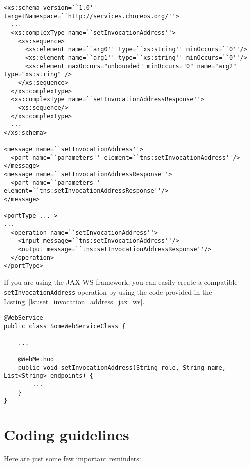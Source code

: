 \documentclass[a4paper, 10pt]{article}
\begin{document}
{\footnotesize
\begin{lstlisting}[caption=Parts of the service WSDL that define the \texttt{setInvocationAddress} operation, label=lst:set_invocation_address_wsdl] 
<xs:schema version=``1.0'' targetNamespace=``http://services.choreos.org/''>
  ...
  <xs:complexType name=``setInvocationAddress''>
    <xs:sequence>
      <xs:element name=``arg0'' type=``xs:string'' minOccurs=``0''/>
      <xs:element name=``arg1'' type=``xs:string'' minOccurs=``0''/>
      <xs:element maxOccurs="unbounded" minOccurs="0" name="arg2" type="xs:string" />
    </xs:sequence>
  </xs:complexType>
  <xs:complexType name=``setInvocationAddressResponse''>
    <xs:sequence/>
  </xs:complexType>
  ...
</xs:schema>

<message name=``setInvocationAddress''>
  <part name=``parameters'' element=``tns:setInvocationAddress''/>
</message>
<message name=``setInvocationAddressResponse''>
  <part name=``parameters'' element=``tns:setInvocationAddressResponse''/>
</message>

<portType ... >
...
  <operation name=``setInvocationAddress''>
    <input message=``tns:setInvocationAddress''/>
    <output message=``tns:setInvocationAddressResponse''/>
  </operation>
</portType>
\end{lstlisting}
}

If you are using the JAX-WS framework, you can easily create a compatible \texttt{setInvocationAddress} operation by using the code provided in the Listing~\ref{lst:set_invocation_address_jax_ws}.

\lstset{
language=Java
}

{\footnotesize
\begin{lstlisting}[caption=Implementing \texttt{setInvocationAddress} with JAX-WS, label=lst:set_invocation_address_jax_ws] 
@WebService
public class SomeWebServiceClass {

    ...
    
    @WebMethod
    public void setInvocationAddress(String role, String name, List<String> endpoints) {
		...
    }
}
\end{lstlisting}
}

\section{Coding guidelines}

Here are just some few important reminders:
\end{document}
